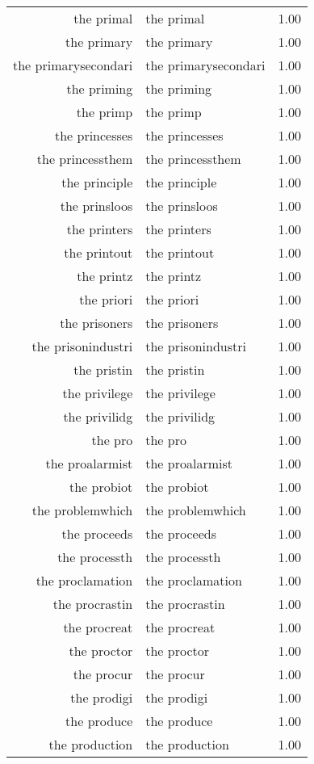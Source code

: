 \begin{table}[ht]
\begin{tabular}{rlr}
  the primal & the primal & 1.00 \\ 
  the primary & the primary & 1.00 \\ 
  the primarysecondari & the primarysecondari & 1.00 \\ 
  the priming & the priming & 1.00 \\ 
  the primp & the primp & 1.00 \\ 
  the princesses & the princesses & 1.00 \\ 
  the princessthem & the princessthem & 1.00 \\ 
  the principle & the principle & 1.00 \\ 
  the prinsloos & the prinsloos & 1.00 \\ 
  the printers & the printers & 1.00 \\ 
  the printout & the printout & 1.00 \\ 
  the printz & the printz & 1.00 \\ 
  the priori & the priori & 1.00 \\ 
  the prisoners & the prisoners & 1.00 \\ 
  the prisonindustri & the prisonindustri & 1.00 \\ 
  the pristin & the pristin & 1.00 \\ 
  the privilege & the privilege & 1.00 \\ 
  the privilidg & the privilidg & 1.00 \\ 
  the pro & the pro & 1.00 \\ 
  the proalarmist & the proalarmist & 1.00 \\ 
  the probiot & the probiot & 1.00 \\ 
  the problemwhich & the problemwhich & 1.00 \\ 
  the proceeds & the proceeds & 1.00 \\ 
  the processth & the processth & 1.00 \\ 
  the proclamation & the proclamation & 1.00 \\ 
  the procrastin & the procrastin & 1.00 \\ 
  the procreat & the procreat & 1.00 \\ 
  the proctor & the proctor & 1.00 \\ 
  the procur & the procur & 1.00 \\ 
  the prodigi & the prodigi & 1.00 \\ 
  the produce & the produce & 1.00 \\ 
  the production & the production & 1.00 \\ 

\end{tabular}
\end{table}
